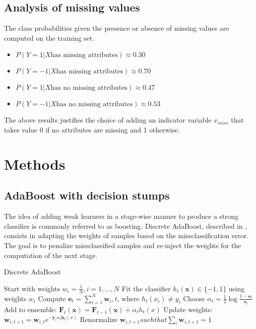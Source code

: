 \documentclass[10pt,conference,compsocconf]{IEEEtran}
\begin{document}
\subsection{Analysis of missing values}
\label{sec:orgheadline7}
The class probabilities given the presence or absence of missing values are computed on the training set. 
\begin{itemize}
\item \(P(Y=1|X \text{has missing attributes}) \approx 0.30\)
\item \(P(Y=-1|X \text{has missing attributes}) \approx 0.70\)
\item \(P(Y=1|X \text{has no missing attributes}) \approx 0.47\)
\item \(P(Y=-1|X \text{has no missing attributes}) \approx 0.53\)
\end{itemize}

The above results justifies the choice of adding an indicator variable \(x_{miss}\) that takes value 0 if no attributes are missing and 1 otherwise.

\section{Methods}
\label{sec:orgheadline11}

\subsection{AdaBoost with decision stumps}
\label{sec:orgheadline9}
The idea of adding weak learners in a stage-wise manner to produce a strong classifier is commonly referred to as boosting. Discrete AdaBoost, described in \cite{friedman98}, consists in adapting the weights of samples based on the missclassification error. The goal is to penalize missclassified samples and re-inject the weights for the computation of the next stage.

\begin{algorithm}
\caption{Discrete AdaBoost}
\label{CHalgorithm}
\begin{algorithmic}[1]
\State Start with weights $w_i = \frac{1}{N}, i=1,...,N$
\State Fit the classifier $h_t(\bm{x}) \in \{-1,1\}$ using weights $w_i$
\State Compute $\bm{e}_t = \sum_{i=1}^N{\bm{w}_i,t}$, where $h_t(x_i) \neq y_i$
\State Choose $\alpha_t = \frac{1}{2} \log{\frac{1-\bm{e}_t}{\bm{e}_t}}$
\State Add to ensemble: $\bm{F}_t(\bm{x}) = \bm{F}_{t-1}(\bm{x}) + \alpha_t h_t(x)$ 
\State Update weights: $\bm{w}_{i,t+1} = \bm{w}_{i,t} e^{-\bm{y}_i \alpha_t \bm{h}_t(x)}$ 
\State Renormalize $\bm{w}_{i,t+1} such that \sum_i{\bm{w}_{i,t+1}} = 1$
\EndFor
\EndProcedure
\end{algorithmic}
\end{algorithm}
\end{document}
